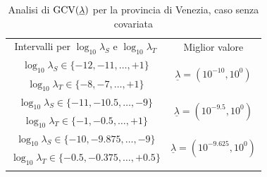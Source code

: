 \documentclass[a4paper,11pt,twoside,openright]{book}							%
\begin{document}
\newpage
\begin{table}[h]
\renewcommand{\arraystretch}{1.3}
\setlength{\tabcolsep}{2mm}
\centering
	\begin{tabular}{!{\vrule width 1.2pt}c!{\vrule width 1.2pt}c!{\vrule width 1.2pt}}
	Intervalli per $\log_{10}\lambda_S$ e $\log_{10}\lambda_T$& Miglior valore											\\
	$\log_{10}\lambda_S \in \{-12,-11,\ldots,+1\}$ 	&  			\\
	$\log_{10}\lambda_T \in \{-8,-7,\ldots,+1\}$		& 															\\	
	$\log_{10}\lambda_S \in \{-11,-10.5,\ldots,-9\}$ 	&  		\\
	$\log_{10}\lambda_T \in \{-1,-0.5,\ldots,+1\}$	& 															\\	
	$\log_{10}\lambda_S \in \{-10,-9.875,\ldots,-9\}$ 	& 	\\
	$\log_{10}\lambda_T \in \{-0.5,-0.375,\ldots,+0.5\}$		& 			\\	
	\end{tabular}
\caption{Analisi di $\mathrm{GCV}(\protect\underline{\lambda})$ per la provincia di Venezia, caso senza covariata}
\label{tab:Ven}
\end{table}
\end{document}
